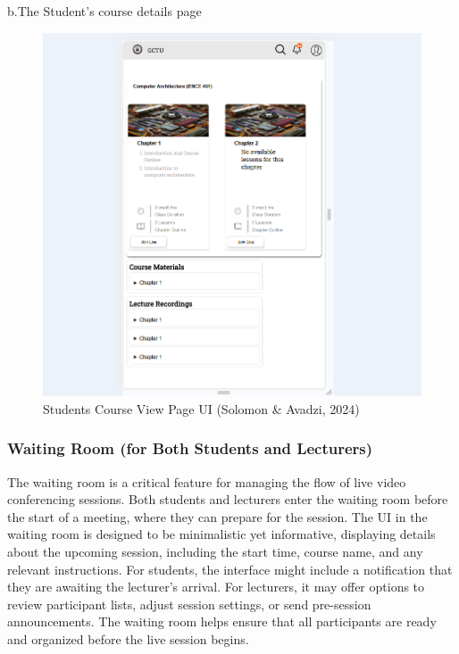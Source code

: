 \documentclass[a4paper,12pt]{article}  %
\begin{document}
b.The Student’s  course details page\\
\begin{figure}[H]
      \centering
      \includegraphics[width=1\textwidth]{figures/stud-c-deets.png}
      \caption{Students Course View Page UI (Solomon \& Avadzi, 2024)}
\end{figure}

\subsubsection{Waiting Room (for Both Students and Lecturers)}
The waiting room is a critical feature for managing the flow of live video conferencing sessions. Both students and lecturers enter the waiting room before the start of a meeting, where they can prepare for the session. The UI in the waiting room is designed to be minimalistic yet informative, displaying details about the upcoming session, including the start time, course name, and any relevant instructions. For students, the interface might include a notification that they are awaiting the lecturer’s arrival. For lecturers, it may offer options to review participant lists, adjust session settings, or send pre-session announcements. The waiting room helps ensure that all participants are ready and organized before the live session begins.\\
\end{document}
